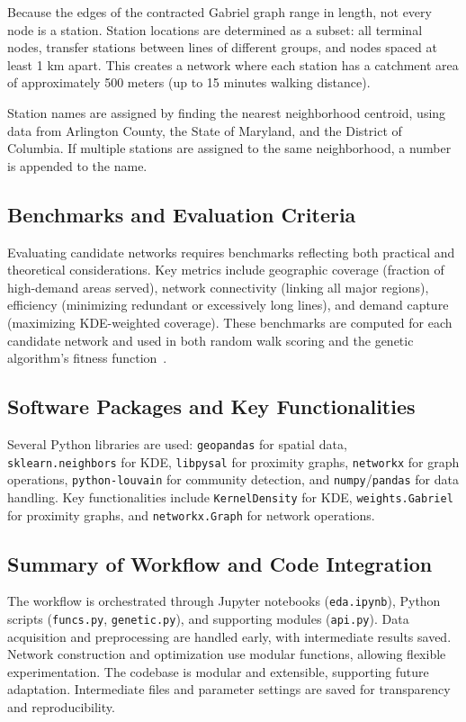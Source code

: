 \documentclass[manuscript]{acmart}
\begin{document}
Because the edges of the contracted Gabriel graph range in length, not every node is a station. Station locations are determined as a subset: all terminal nodes, transfer stations between lines of different groups, and nodes spaced at least 1 km apart. This creates a network where each station has a catchment area of approximately 500 meters (up to 15 minutes walking distance).

Station names are assigned by finding the nearest neighborhood centroid, using data from Arlington County, the State of Maryland, and the District of Columbia. If multiple stations are assigned to the same neighborhood, a number is appended to the name.

\subsection{Benchmarks and Evaluation Criteria}
Evaluating candidate networks requires benchmarks reflecting both practical and theoretical considerations. Key metrics include geographic coverage (fraction of high-demand areas served), network connectivity (linking all major regions), efficiency (minimizing redundant or excessively long lines), and demand capture (maximizing KDE-weighted coverage). These benchmarks are computed for each candidate network and used in both random walk scoring and the genetic algorithm's fitness function~\cite{bib:bast2016route, bib:overview-field}.

\subsection{Software Packages and Key Functionalities}
Several Python libraries are used: \texttt{geopandas} for spatial data, \texttt{sklearn.neighbors} for KDE, \texttt{libpysal} for proximity graphs, \texttt{networkx} for graph operations, \texttt{python-louvain} for community detection, and \texttt{numpy}/\texttt{pandas} for data handling. Key functionalities include \texttt{KernelDensity} for KDE, \texttt{weights.Gabriel} for proximity graphs, and \texttt{networkx.Graph} for network operations.

\subsection{Summary of Workflow and Code Integration}
The workflow is orchestrated through Jupyter notebooks (\texttt{eda.ipynb}), Python scripts (\texttt{funcs.py}, \texttt{genetic.py}), and supporting modules (\texttt{api.py}). Data acquisition and preprocessing are handled early, with intermediate results saved. Network construction and optimization use modular functions, allowing flexible experimentation. The codebase is modular and extensible, supporting future adaptation. Intermediate files and parameter settings are saved for transparency and reproducibility.
\end{document}
